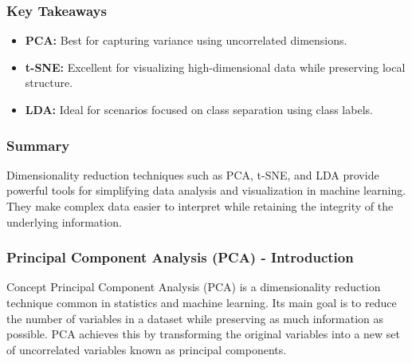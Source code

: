 \documentclass[aspectratio=169]{beamer}
\begin{document}
\begin{frame}[fragile]
    \frametitle{Key Takeaways}
    \begin{itemize}
        \item \textbf{PCA:} Best for capturing variance using uncorrelated dimensions.
        \item \textbf{t-SNE:} Excellent for visualizing high-dimensional data while preserving local structure.
        \item \textbf{LDA:} Ideal for scenarios focused on class separation using class labels.
    \end{itemize}
\end{frame}

\begin{frame}[fragile]
    \frametitle{Summary}
    Dimensionality reduction techniques such as PCA, t-SNE, and LDA provide powerful tools for simplifying data analysis and visualization in machine learning. They make complex data easier to interpret while retaining the integrity of the underlying information.
\end{frame}

\begin{frame}[fragile]
  \frametitle{Principal Component Analysis (PCA) - Introduction}
  \begin{block}{Concept}
    Principal Component Analysis (PCA) is a dimensionality reduction technique common in statistics and machine learning. 
    Its main goal is to reduce the number of variables in a dataset while preserving as much information as possible.
    PCA achieves this by transforming the original variables into a new set of uncorrelated variables known as principal components.
  \end{block}
\end{frame}
\end{document}
